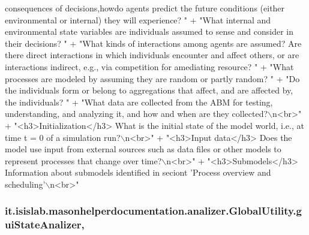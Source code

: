 \begin{DoxyCode}
{       consequences of decisions,howdo agents predict the future conditions (either environmental or internal)
       they will experience? "}
                                             +                            \textcolor{stringliteral}{"What internal and environmental
       state variables are individuals assumed to sense and consider in their decisions? "}
                                             +                            \textcolor{stringliteral}{"What kinds of interactions among
       agents are assumed? Are there direct interactions in which individuals encounter and affect others, or are
       interactions indirect, e.g., via competition for amediating resource? "}
                                             +                            \textcolor{stringliteral}{"What processes are modeled by
       assuming they are random or partly random? "}
                                             +                            \textcolor{stringliteral}{"Do the individuals form or
       belong to aggregations that affect, and are affected by, the individuals? "}
                                             +                            \textcolor{stringliteral}{"What data are collected from the
       ABM for testing, understanding, and analyzing it, and how and when are they collected?\(\backslash\)n<br>"}
                                             + \textcolor{stringliteral}{"<h3>Initialization</h3> What is the initial state of the
       model world, i.e., at time t = 0 of a simulation run?\(\backslash\)n<br>"}
                                             + \textcolor{stringliteral}{"<h3>Input data</h3> Does the model use input from external
       sources such as data files or other models to represent processes that change over time?\(\backslash\)n<br>"}
                                             + \textcolor{stringliteral}{"<h3>Submodels</h3> Information about submodels identified
       in seciont 'Process overview and scheduling'\(\backslash\)n<br>"}
\end{DoxyCode}
\hypertarget{classit_1_1isislab_1_1masonhelperdocumentation_1_1analizer_1_1_global_utility_a0104f618583fd4e003dcc2b40ba5b8e8}{
\subsubsection[{gui\-State\-Analizer}]{ it.\-isislab.\-masonhelperdocumentation.\-analizer.\-Global\-Utility.\-gui\-State\-Analizer\hspace{0.3cm}{\ttfamily [static]}, {\ttfamily [private]}}}\label{classit_1_1isislab_1_1masonhelperdocumentation_1_1analizer_1_1_global_utility_a0104f618583fd4e003dcc2b40ba5b8e8}
